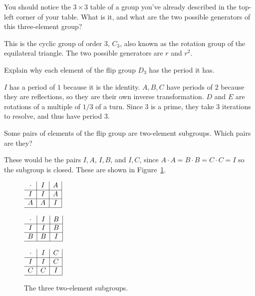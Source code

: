 \documentclass[../gatm_answers.tex]{subfiles}
\begin{document}
\begin{outer_problem}
\item You should notice the $3\times 3$ table of a group you've already described in the top-left corner of your table. What is it, and what are the two possible generators of this three-element group?
\end{outer_problem}

This is the cyclic group of order $3$, $C_3$, also known as the rotation group of the equilateral triangle. The two possible generators are $r$ and $r^2$.

\begin{outer_problem}
\item Explain why each element of the flip group $D_3$ has the period it has.
\end{outer_problem}

$I$ has a period of $1$ because it is the identity. $A,B,C$ have periods of $2$ because they are reflections, so they are their own inverse transformation. $D$ and $E$ are rotations of a multiple of $1/3$ of a turn. Since $3$ is a prime, they take $3$ iterations to resolve, and thus have period $3$.

\begin{outer_problem}
\item Some pairs of elements of the flip group are two-element subgroups. Which pairs are they?
\end{outer_problem}

These would be the pairs ${I,A}$, ${I,B}$, and ${I,C}$, since $A\cdot A=B\cdot B=C\cdot C = I$ so the subgroup is closed. These are shown in Figure~\ref{fig:two_elem_subgroups}.

\begin{figure}[h]
\begin{minipage}{0.3\textwidth}
\centering
$\begin{array}{c|c|c|}
\cdot & I & A \\ \hline
I & I & A \\ \hline
A & A & I \\ \hline
\end{array}$
\end{minipage}\hfill
\begin{minipage}{0.3\textwidth}
\centering
$\begin{array}{c|c|c|}
\cdot & I & B \\ \hline
I & I & B \\ \hline
B & B & I \\ \hline
\end{array}$
\end{minipage}\hfill
\begin{minipage}{0.3\textwidth}
\centering
$\begin{array}{c|c|c|}
\cdot & I & C \\ \hline
I & I & C \\ \hline
C & C & I \\ \hline
\end{array}$
\end{minipage}
\caption{The three two-element subgroups.}
\label{fig:two_elem_subgroups}
\end{figure}
\end{document}
